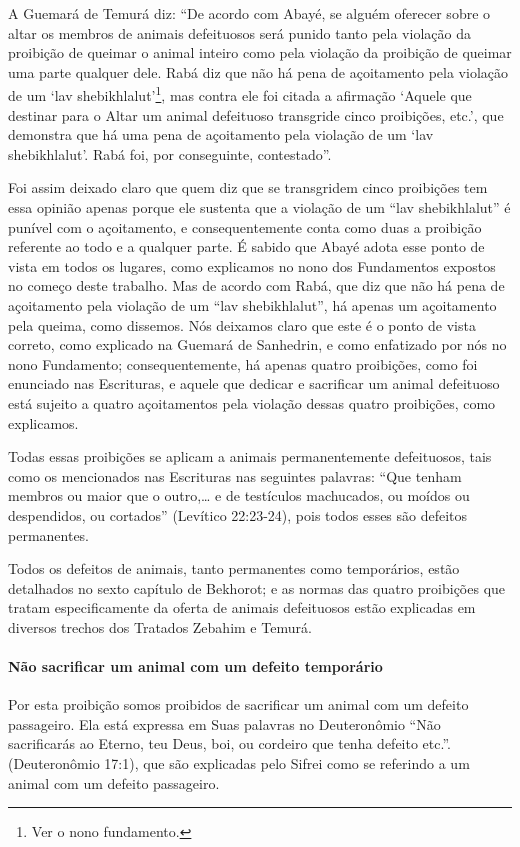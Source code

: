 A Guemará de Temurá diz: ``De acordo com Abayé, se alguém oferecer
sobre o altar os membros de animais defeituosos será punido tanto pela
violação da proibição de queimar o animal inteiro como pela violação da
proibição de queimar uma parte qualquer dele. Rabá diz que não há pena
de açoitamento pela violação de um `lav
shebikhlalut'\footnote{Ver o nono fundamento.}, mas contra ele foi citada a
afirmação `Aquele que destinar para o Altar um animal defeituoso
transgride cinco proibições, etc.', que demonstra que há uma pena de
açoitamento pela violação de um `lav shebikhlalut'. Rabá foi, por
conseguinte, contestado''.

Foi assim deixado claro que quem diz que se transgridem cinco proibições
tem essa opinião apenas porque ele sustenta que a violação de um ``lav
shebikhlalut'' é punível com o açoitamento, e consequentemente conta
como duas a proibição referente ao todo e a qualquer parte. É sabido que
Abayé adota esse ponto de vista em todos os lugares, como explicamos no
nono dos Fundamentos expostos no começo deste trabalho. Mas de acordo
com Rabá, que diz que não há pena de açoitamento pela violação de um
``lav shebikhlalut'', há apenas um açoitamento pela queima, como
dissemos. Nós deixamos claro que este é o ponto de vista correto, como
explicado na Guemará de Sanhedrin, e como enfatizado por nós no nono
Fundamento; consequentemente, há apenas quatro proibições, como foi
enunciado nas Escrituras, e aquele que dedicar e sacrificar um animal
defeituoso está sujeito a quatro açoitamentos pela violação dessas
quatro proibições, como explicamos.

Todas essas proibições se aplicam a animais permanentemente defeituosos,
tais como os mencionados nas Escrituras nas seguintes palavras: ``Que
tenham membros ou maior que o outro,\ldots{} e de testículos machucados, ou
moídos ou despendidos, ou cortados'' (Levítico 22:23-24), pois todos
esses são defeitos permanentes.

Todos os defeitos de animais, tanto permanentes como temporários, estão
detalhados no sexto capítulo de Bekhorot; e as normas das quatro
proibições que tratam especificamente da oferta de animais defeituosos
estão explicadas em diversos trechos dos Tratados Zebahim e Temurá.

\paragraph{Não sacrificar um animal com um defeito temporário}

Por esta proibição somos proibidos de sacrificar um animal com um
defeito passageiro. Ela está expressa em Suas palavras no Deuteronômio
``Não sacrificarás ao Eterno, teu Deus, boi, ou cordeiro que tenha
defeito etc.''. (Deuteronômio 17:1), que são explicadas pelo Sifrei
como se referindo a um animal com um defeito passageiro.

